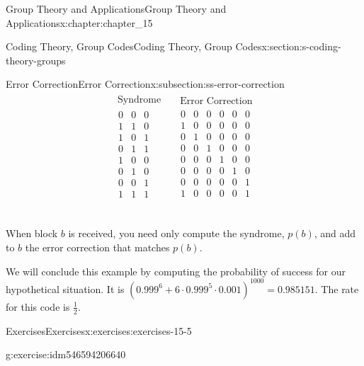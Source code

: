 \documentclass[oneside,10pt,]{book}
\numberwithin{equation}{section}
\begin{document}
\begin{chapterptx}{Group Theory and Applications}{}{Group Theory and Applications}{}{}{x:chapter:chapter_15}
\begin{sectionptx}{Coding Theory, Group Codes}{}{Coding Theory, Group Codes}{}{}{x:section:s-coding-theory-groups}
\begin{subsectionptx}{Error Correction}{}{Error Correction}{}{}{x:subsection:ss-error-correction}
\begin{equation*}
\begin{array}{c|c}
\begin{array}{c}
\textrm{ Syndrome} \\
\hline
\begin{array}{ccc}
0 & 0 & 0 \\
1 & 1 & 0 \\
1 & 0 & 1 \\
0 & 1 & 1 \\
1 & 0 & 0 \\
0 & 1 & 0 \\
0 & 0 & 1 \\
1 & 1 & 1 \\
\end{array}
\\
\end{array}
& 	  
\begin{array}{c}
\textrm{ Error} \textrm{ Correction} \\
\hline
\begin{array}{cccccc}
0 & 0 & 0 & 0 & 0 & 0 \\
1 & 0 & 0 & 0 & 0 & 0 \\
0 & 1 & 0 & 0 & 0 & 0 \\
0 & 0 & 1 & 0 & 0 & 0 \\
0 & 0 & 0 & 1 & 0 & 0 \\
0 & 0 & 0 & 0 & 1 & 0 \\
0 & 0 & 0 & 0 & 0 & 1 \\
1 & 0 & 0 & 0 & 0 & 1 \\
\end{array}
\\
\end{array}
\\
\end{array}
\end{equation*}
%
\par
When block \(b\) is received, you need only compute the syndrome, \(p(b)\), and add to \(b\) the error correction that matches \(p(b)\).%
\par
We will conclude this example by computing the probability of success for our hypothetical situation. It is  \(\left(0.999^6 + 6 \cdot 0.999^5 \cdot 0.001\right)^{1000}=0.985151\). The rate for this code is \(\frac{1}{2}\).%
\end{subsectionptx}
%
%
\typeout{************************************************}
\typeout{************************************************}
%
\begin{exercises-subsection}{Exercises}{}{Exercises}{}{}{x:exercises:exercises-15-5}
\begin{divisionexercise}{1}{}{}{g:exercise:idm546594206640}%

\end{divisionexercise}
\end{exercises-subsection}
\end{sectionptx}
\end{chapterptx}
\end{document}
